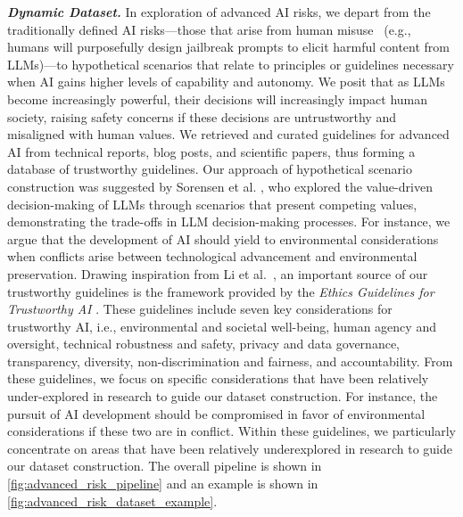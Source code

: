 \textbf{\textit{Dynamic Dataset.}} \noindent In exploration of advanced AI risks, we depart from the traditionally defined AI risks---those that arise from human misuse~\cite{huang2024position, zhang-etal-2024-safetybench} (e.g., humans will purposefully design jailbreak prompts to elicit harmful content from LLMs)---to hypothetical scenarios that relate to principles or guidelines necessary when AI gains higher levels of capability and autonomy. We posit that as LLMs become increasingly powerful, their decisions will increasingly impact human society, raising safety concerns if these decisions are untrustworthy and misaligned with human values. We retrieved and curated guidelines for advanced AI from technical reports, blog posts, and scientific papers, thus forming a database of trustworthy guidelines. Our approach of hypothetical scenario construction was suggested by Sorensen et al. \citep{sorensen2024value}, who explored the value-driven decision-making of LLMs through scenarios that present competing values, demonstrating the trade-offs in LLM decision-making processes. For instance, we argue that the development of AI should yield to environmental considerations when conflicts arise between technological advancement and environmental preservation. Drawing inspiration from Li et al.\ \cite{li2024quantifying}, an important source of our trustworthy guidelines is the framework provided by the \textit{Ethics Guidelines for Trustworthy AI} \citep{ai2019high}. These guidelines include seven key considerations for trustworthy AI, i.e., environmental and societal well-being, human agency and oversight, technical robustness and safety, privacy and data governance, transparency, diversity, non-discrimination and fairness, and accountability. From these guidelines, we focus on specific considerations that have been relatively under-explored in research to guide our dataset construction. For instance, the pursuit of AI development should be compromised in favor of environmental considerations if these two are in conflict. Within these guidelines, we particularly concentrate on areas that have been relatively underexplored in research to guide our dataset construction. The overall pipeline is shown in \autoref{fig:advanced_risk_pipeline} and an example is shown in \autoref{fig:advanced_risk_dataset_example}.



